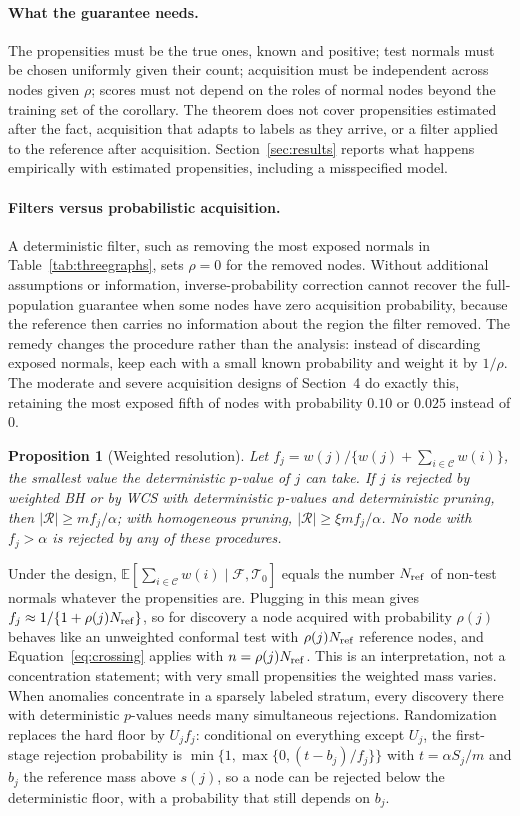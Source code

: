 \documentclass[twoside]{article}
\newtheorem{proposition}{Proposition}
\newcommand{\E}{\mathbb{E}}
\newcommand{\calset}{\mathcal{C}}
\newcommand{\testset}{\mathcal{T}}
\begin{document}
\paragraph{What the guarantee needs.}
The propensities must be the true ones, known and positive; test normals must be chosen uniformly given their count; acquisition must be independent across nodes given $\rho$; scores must not depend on the roles of normal nodes beyond the training set of the corollary. The theorem does not cover propensities estimated after the fact, acquisition that adapts to labels as they arrive, or a filter applied to the reference after acquisition. Section~\ref{sec:results} reports what happens empirically with estimated propensities, including a misspecified model.

\paragraph{Filters versus probabilistic acquisition.}
A deterministic filter, such as removing the most exposed normals in Table~\ref{tab:threegraphs}, sets $\rho=0$ for the removed nodes. Without additional assumptions or information, inverse-probability correction cannot recover the full-population guarantee when some nodes have zero acquisition probability, because the reference then carries no information about the region the filter removed. The remedy changes the procedure rather than the analysis: instead of discarding exposed normals, keep each with a small known probability and weight it by $1/\rho$. The moderate and severe acquisition designs of Section~4 do exactly this, retaining the most exposed fifth of nodes with probability $0.10$ or $0.025$ instead of $0$.

\begin{proposition}[Weighted resolution]
\label{prop:wresolution}
Let $f_j=w(j)/\{w(j)+\sum_{i\in\calset}w(i)\}$, the smallest value the deterministic $p$-value of $j$ can take. If $j$ is rejected by weighted BH or by WCS with deterministic $p$-values and deterministic pruning, then $|\mathcal R|\ge mf_j/\alpha$; with homogeneous pruning, $|\mathcal R|\ge\xi mf_j/\alpha$. No node with $f_j>\alpha$ is rejected by any of these procedures.
\end{proposition}
Under the design, $\E[\sum_{i\in\calset}w(i)\mid\mathcal F,\testset_0]$ equals the number $N_{\rm ref}$ of non-test normals whatever the propensities are. Plugging in this mean gives $f_j\approx1/\{1+\rho(j)N_{\rm ref}\}$, so for discovery a node acquired with probability $\rho(j)$ behaves like an unweighted conformal test with $\rho(j)N_{\rm ref}$ reference nodes, and Equation~\eqref{eq:crossing} applies with $n=\rho(j)N_{\rm ref}$. This is an interpretation, not a concentration statement; with very small propensities the weighted mass varies. When anomalies concentrate in a sparsely labeled stratum, every discovery there with deterministic $p$-values needs many simultaneous rejections. Randomization replaces the hard floor by $U_jf_j$: conditional on everything except $U_j$, the first-stage rejection probability is $\min\{1,\max\{0,(t-b_j)/f_j\}\}$ with $t=\alpha S_j/m$ and $b_j$ the reference mass above $s(j)$, so a node can be rejected below the deterministic floor, with a probability that still depends on $b_j$.
\end{document}
